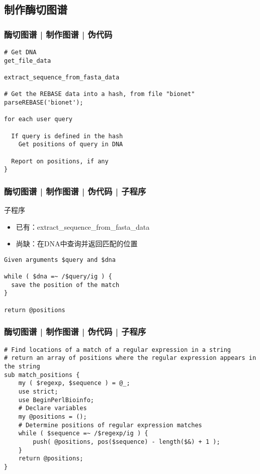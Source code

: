 \subsection{制作酶切图谱}
\begin{frame}[fragile]
  \frametitle{酶切图谱 | 制作图谱 | 伪代码}
  \vspace{-1.5em}
\begin{lstlisting}
# Get DNA
get_file_data

extract_sequence_from_fasta_data

# Get the REBASE data into a hash, from file "bionet"
parseREBASE('bionet');

for each user query

  If query is defined in the hash
    Get positions of query in DNA

  Report on positions, if any
}
\end{lstlisting}
\end{frame}

\begin{frame}[fragile]
  \frametitle{酶切图谱 | 制作图谱 | 伪代码 | 子程序}
  \begin{block}{子程序}
    \begin{itemize}
      \item 已有：extract\_sequence\_from\_fasta\_data
      \item 尚缺：在DNA中查询并返回匹配的位置
    \end{itemize}
  \end{block}
  \pause
  \vspace{-1.5em}
\begin{lstlisting}
Given arguments $query and $dna

while ( $dna =~ /$query/ig ) {
  save the position of the match
}

return @positions
\end{lstlisting}
\end{frame}

\begin{frame}[fragile]
  \frametitle{酶切图谱 | 制作图谱 | 伪代码 | \alert{子程序}}
  \vspace{-1.5em}
\begin{lstlisting}[basicstyle=\small\tt,numberstyle=\footnotesize]
# Find locations of a match of a regular expression in a string
# return an array of positions where the regular expression appears in the string
sub match_positions {
    my ( $regexp, $sequence ) = @_;
    use strict;
    use BeginPerlBioinfo;
    # Declare variables
    my @positions = ();
    # Determine positions of regular expression matches
    while ( $sequence =~ /$regexp/ig ) {
        push( @positions, pos($sequence) - length($&) + 1 );
    }
    return @positions;
}
\end{lstlisting}
\end{frame}

